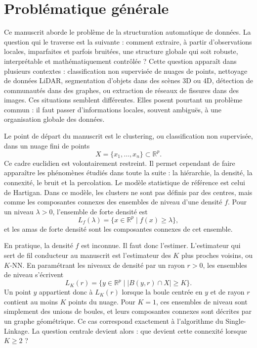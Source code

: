 \section*{Problématique générale}


Ce manuscrit aborde le problème de la structuration automatique de données. La question qui le traverse est la suivante : comment extraire, à partir d'observations locales, imparfaites et parfois bruitées, une structure globale qui soit robuste, interprétable et mathématiquement contrôlée ? Cette question apparaît dans plusieurs contextes : classification non supervisée de nuages de points, nettoyage de données LiDAR, segmentation d'objets dans des scènes 3D ou 4D, détection de communautés dans des graphes, ou extraction de réseaux de fissures dans des images. Ces situations semblent différentes. Elles posent pourtant un problème commun : il faut passer d'informations locales, souvent ambiguës, à une organisation globale des données.

Le point de départ du manuscrit est le clustering, ou classification non supervisée, dans un nuage fini de points
\[
X = \{x_1,\ldots,x_n\}\subset \mathbb{R}^p.
\]
Ce cadre euclidien est volontairement restreint. Il permet cependant de faire apparaître les phénomènes étudiés dans toute la suite : la hiérarchie, la densité, la connexité, le bruit et la percolation. Le modèle statistique de référence est celui de Hartigan. Dans ce modèle, les clusters ne sont pas définis par des centres, mais comme les composantes connexes des ensembles de niveau d'une densité $f$. Pour un niveau $\lambda>0$, l'ensemble de forte densité est
\[
L_f(\lambda)=\{x\in \mathbb{R}^p\mid f(x)\geq \lambda\},
\]
et les amas de forte densité sont les composantes connexes de cet ensemble.

En pratique, la densité $f$ est inconnue. Il faut donc l'estimer. L'estimateur qui sert de fil conducteur au manuscrit est l'estimateur des $K$ plus proches voisins, ou $K$-NN. En paramétrant les niveaux de densité par un rayon $r>0$, les ensembles de niveau s'écrivent
\[
L_K(r)=\{y\in \mathbb{R}^p\mid |B(y,r)\cap X|\geq K\}.
\]
Un point $y$ appartient donc à $L_K(r)$ lorsque la boule centrée en $y$ et de rayon $r$ contient au moins $K$ points du nuage. Pour $K=1$, ces ensembles de niveau sont simplement des unions de boules, et leurs composantes connexes sont décrites par un graphe géométrique. Ce cas correspond exactement à l'algorithme du Single-Linkage. La question centrale devient alors : que devient cette connexité lorsque $K\geq 2$ ?

